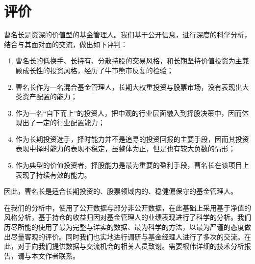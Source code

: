 \documentclass[journal=jacsat,manuscript=article]{achemso}
\providecommand{\tightlist}{%
  \setlength{\itemsep}{0pt}\setlength{\parskip}{0pt}}
\begin{document}
\section{评价}

曹名长是资深的价值型的基金管理人。我们基于公开信息，进行深度的科学分析，结合与其面对面的交流，做出如下评判：

\begin{enumerate}
\def\labelenumi{\arabic{enumi}.}
\tightlist
\item
  曹名长的低换手、长持有、分散持股的交易风格，和长期坚持价值投资为主兼顾成长性的投资风格，经历了牛市熊市反复的检验；
\item
  曹名长作为一名混合基金管理人，长期大权重投资与股票市场，没有表现出大类资产配置的能力；
\item
  作为一名``自下而上''的投资人，把中观的行业层面融入到择股决策中，因而体现出了一定的行业配置能力；
\item
  作为长期投资选手，择时能力并不是追寻的投资回报的主要手段，因而其投资表现中择时能力的表现不稳定，虽整体为正，但是也有较大负数的情形；
\item
  作为典型的价值投资者，择股能力是最为重要的盈利手段，曹名长在该项目上表现了持续有效的能力。
\end{enumerate}

因此，曹名长是适合长期投资的、股票领域内的、稳健偏保守的基金管理人。

\begin{acknowledgement}

在我们的分析中，使用了公开数据与部分非公开数据，在此基础上采用基于净值的风格分析，基于持仓的收益归因对基金管理人的业绩表现进行了科学的分析。我们历尽所能的使用了最为完整与详实的数据、最为科学的方法，以最为严谨的态度做出尽量客观的评价。同时我们也实地进行调研与基金经理人进行了多次的交流。在此，对于向我们提供数据与交流机会的相关人员致谢。需要根伟详细的技术分析报告，请与本文作者联系。

\end{acknowledgement}
\end{document}
